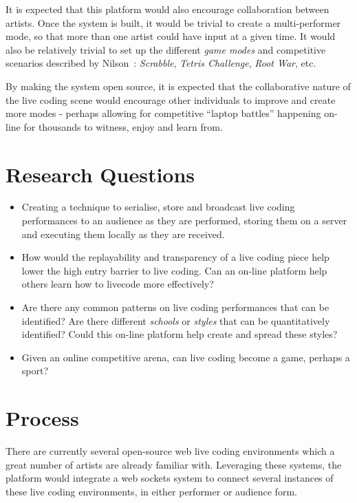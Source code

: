 \documentclass[12pt]{article}
\begin{document}
It is expected that this platform would also encourage collaboration between artists. Once the system is built, it would be trivial to create a multi-performer mode, so that more than one artist could have input at a given time. It would also be relatively trivial to set up the different \emph{game modes} and competitive scenarios described by Nilson~\cite{live-coding-practice}: \emph{Scrabble}, \emph{Tetris Challenge}, \emph{Root War}, etc.

By making the system open source, it is expected that the collaborative nature of the live coding scene would encourage other individuals to improve and create more modes - perhaps allowing for competitive ``laptop battles'' happening on-line for thousands to witness, enjoy and learn from.

\section{Research Questions}\label{research-questions}

\begin{itemize}

\item
Creating a technique to serialise, store and broadcast live coding performances to an audience as they are performed, storing them on a server and executing them locally as they are received.
\item
How would the replayability and transparency of a live coding piece help lower the high entry barrier to live coding. Can an on-line platform help others learn how to livecode more effectively?
\item
Are there any common patterns on live coding performances that can be identified? Are there different \emph{schools} or \emph{styles} that can be quantitatively identified? Could this on-line platform help create and spread these styles?
\item
Given an online competitive arena, can live coding become a game, perhaps a sport?
\end{itemize}


\section{Process}\label{process}
There are currently several open-source web live coding environments which a great number of artists are already familiar with. Leveraging these systems, the platform would integrate a web sockets system to connect several instances of these live coding environments, in either performer or audience form.
\end{document}
